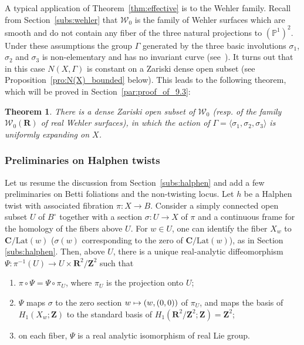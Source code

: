 \documentclass[11pt]{article}
\newcommand{\resp}{resp.\xspace}
\newenvironment{enumeratea}
{\bgroup\def\theenumi{\alph{enumi}}\begin{enumerate}}
{\end{enumerate}\egroup}
\newcommand\mto{\mathchoice{\longmapsto}{\mapsto}{\mapsto}{\mapsto}}
\newcommand{\inv}{^{-1}}
\newcommand{\pp}{\mathbb{P}}\let\P\pp
\def\C{\mathbf{C}}
\def\R{\mathbf{R}}
\def\Z{\mathbf{Z}}
\newcommand{\cW}{\mathcal{W}}
\newcommand{\Lat}{{\mathrm{Lat}}}
\theoremstyle{plain}
\newtheorem{thm}{Theorem}[section]
\theoremstyle{definition}
\numberwithin{equation}{section}
\begin{document}
A typical application of Theorem~\ref{thm:effective} is to the Wehler family.
Recall from Section~\ref{subs:wehler}
that ${ \cW}_0$ is the family of Wehler surfaces which are smooth and do not contain any
fiber of the three natural projections to
$(\pp^1)^2$.
Under these assumptions the group $\Gamma$ generated by the three basic involutions
$\sigma_1$, $\sigma_2$ and $\sigma_3$ is non-elementary and
has no invariant curve (see~\cite[Prop.\,2.2]{finite_orbits}).
It turns out that in this case $N(X, \Gamma)$ is constant on a Zariski
dense open subset (see Proposition~\ref{pro:N(X)_bounded} below).
This leads to the following theorem, which will be proved in Section~\ref{par:proof_of_9.3}:

\begin{thm}\label{thm:wehler_zariski}
There is a dense Zariski open subset of ${ \cW}_0$
(\resp of the family ${ \cW}_0(\R)$ of real Wehler surfaces),
in which the action of $\Gamma=\langle \sigma_1, \sigma_2, \sigma_3\rangle$ is
uniformly expanding on $X$.
\end{thm}

\subsubsection{Preliminaries on Halphen twists}\label{par:preliminaries2_on_Halphen} Let us resume the discussion from Section~\ref{subs:halphen} and add a few preliminaries on Betti foliations and the non-twisting locus. Let $h$ be a Halphen twist with associated fibration $\pi\colon X\to B$.
Consider a simply connected open subset $U$ of $B^\circ$ together with a section $\sigma\colon U\to X$ of $\pi$
and a continuous frame for the homology of the fibers above $U$.
For $w\in U$, one can identify the fiber $X_w$ to $\C/\Lat(w)$ ($\sigma(w)$ corresponding to the zero of $\C/\Lat(w)$), as in Section \ref{subs:halphen}.
Then, above $U$, there is a unique real-analytic diffeomorphism $\Psi: \pi \inv(U)\to U\times \R^2/\Z^2$
such that
\begin{enumeratea}
\item
$\pi\circ \Psi=\Psi\circ \pi_U$, where $\pi_U$ is the projection onto $U$;
\item
$\Psi$ maps $\sigma$ to the zero section $w\mto (w, (0,0))$ of $\pi_U$, and maps the basis of $H_1(X_w;\Z)$ to the standard basis of $H_1(\R^2/\Z^2; \Z)=\Z^2$;
\item
on each fiber, $\Psi$ is a real analytic isomorphism of real Lie group.
\end{enumeratea}
\end{document}
